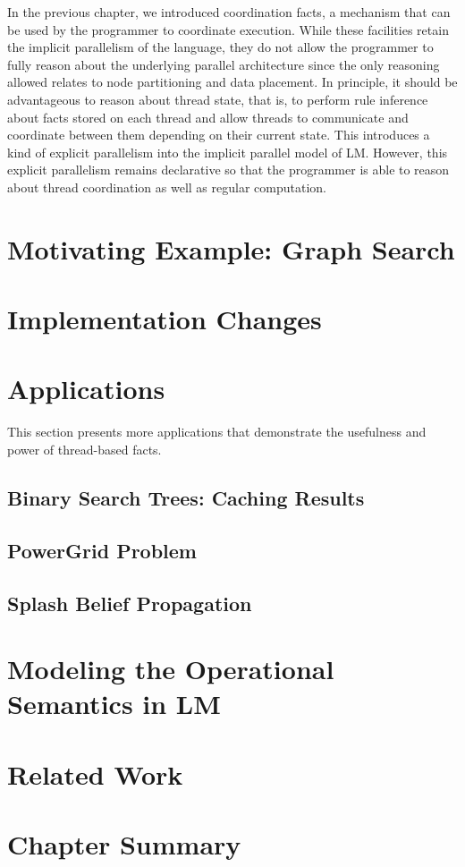 In the previous chapter, we introduced coordination facts, a mechanism that can
be used by the programmer to coordinate execution. While these facilities retain
the implicit parallelism of the language, they do not allow the programmer to
fully reason about the underlying parallel architecture since the only reasoning
allowed relates to node partitioning and data placement. In principle, it should
be advantageous to reason about thread state, that is, to perform rule inference
about facts stored on each thread and allow threads to communicate and
coordinate between them depending on their current state. This introduces a kind
of explicit parallelism into the implicit parallel model of LM.  However, this
explicit parallelism remains declarative so that the programmer is able to
reason about thread coordination as well as regular computation.

\section{Motivating Example: Graph Search}


\section{Implementation Changes}


\section{Applications}

This section presents more applications that demonstrate the usefulness and
power of thread-based facts.

\subsection{Binary Search Trees: Caching Results}


\subsection{PowerGrid Problem}


\subsection{Splash Belief Propagation}\label{sec:coordination:bp}


\section{Modeling the Operational Semantics in LM}


\section{Related Work}


\section{Chapter Summary}

